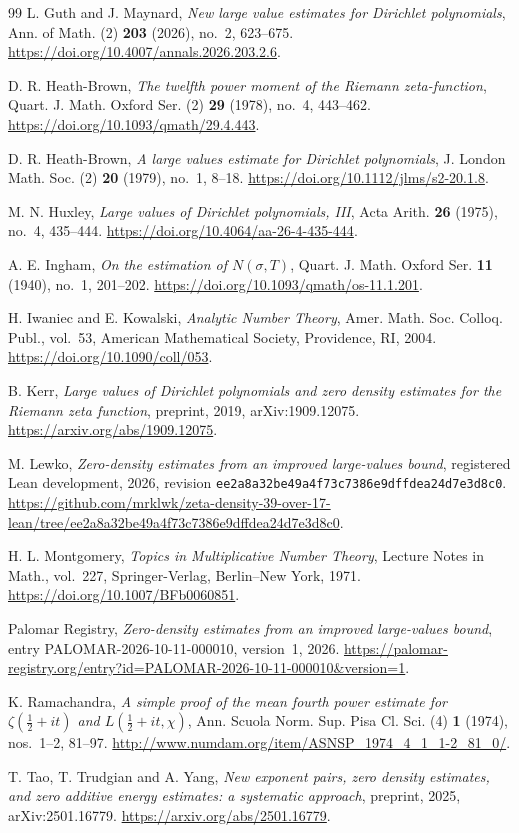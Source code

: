\documentclass[11pt,a4paper,oneside]{article}
\theoremstyle{definition}
\numberwithin{equation}{section}
\begin{document}
\begin{thebibliography}{99}
L. Guth and J. Maynard, \emph{New large value estimates for Dirichlet polynomials},
Ann. of Math. (2) \textbf{203} (2026), no.~2, 623--675.
\url{https://doi.org/10.4007/annals.2026.203.2.6}.

D. R. Heath-Brown, \emph{The twelfth power moment of the Riemann zeta-function},
Quart. J. Math. Oxford Ser. (2) \textbf{29} (1978), no.~4, 443--462.
\url{https://doi.org/10.1093/qmath/29.4.443}.

D. R. Heath-Brown, \emph{A large values estimate for Dirichlet polynomials},
J. London Math. Soc. (2) \textbf{20} (1979), no.~1, 8--18.
\url{https://doi.org/10.1112/jlms/s2-20.1.8}.

M. N. Huxley, \emph{Large values of Dirichlet polynomials, III},
Acta Arith. \textbf{26} (1975), no.~4, 435--444.
\url{https://doi.org/10.4064/aa-26-4-435-444}.

A. E. Ingham, \emph{On the estimation of $N(\sigma,T)$},
Quart. J. Math. Oxford Ser. \textbf{11} (1940), no.~1, 201--202.
\url{https://doi.org/10.1093/qmath/os-11.1.201}.

H. Iwaniec and E. Kowalski, \emph{Analytic Number Theory},
Amer. Math. Soc. Colloq. Publ., vol.~53, American Mathematical Society,
Providence, RI, 2004.
\url{https://doi.org/10.1090/coll/053}.

B. Kerr, \emph{Large values of Dirichlet polynomials and zero density estimates
for the Riemann zeta function}, preprint, 2019, arXiv:1909.12075.
\url{https://arxiv.org/abs/1909.12075}.

M. Lewko, \emph{Zero-density estimates from an improved large-values bound},
registered Lean development, 2026, revision
\nolinkurl{ee2a8a32be49a4f73c7386e9dffdea24d7e3d8c0}.
\url{https://github.com/mrklwk/zeta-density-39-over-17-lean/tree/ee2a8a32be49a4f73c7386e9dffdea24d7e3d8c0}.

H. L. Montgomery, \emph{Topics in Multiplicative Number Theory},
Lecture Notes in Math., vol.~227, Springer-Verlag, Berlin--New York, 1971.
\url{https://doi.org/10.1007/BFb0060851}.

Palomar Registry, \emph{Zero-density estimates from an improved large-values bound},
entry PALOMAR-2026-10-11-000010, version~1, 2026.
\url{https://palomar-registry.org/entry?id=PALOMAR-2026-10-11-000010&version=1}.

K. Ramachandra, \emph{A simple proof of the mean fourth power estimate for
$\zeta(\tfrac12+it)$ and $L(\tfrac12+it,\chi)$},
Ann. Scuola Norm. Sup. Pisa Cl. Sci. (4) \textbf{1} (1974), nos.~1--2, 81--97.
\url{http://www.numdam.org/item/ASNSP_1974_4_1_1-2_81_0/}.

T. Tao, T. Trudgian and A. Yang, \emph{New exponent pairs, zero density estimates,
and zero additive energy estimates: a systematic approach}, preprint, 2025,
arXiv:2501.16779.
\url{https://arxiv.org/abs/2501.16779}.
\end{thebibliography}
\end{document}

